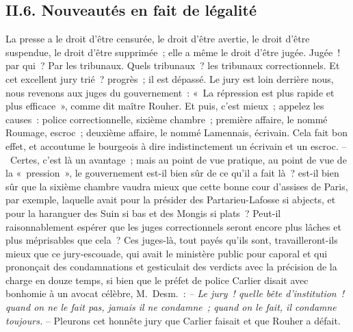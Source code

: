 \documentclass[french,twoside]{book} %
\begin{document}
\subsection[{II.6. Nouveautés en fait de légalité}]{II.6. Nouveautés en fait de légalité}
\noindent La presse a le droit d’être censurée, le droit d’être avertie, le droit d’être suspendue, le droit d’être supprimée ; elle a même le droit d’être jugée. Jugée ! par qui ? Par les tribunaux. Quels tribunaux ? les tribunaux correctionnels. Et cet excellent jury trié ? progrès ; il est dépassé. Le jury est loin derrière nous, nous revenons aux juges du gouvernement : « La répression est plus rapide et plus efficace », comme dit maître Rouher. Et puis, c’est mieux ; appelez les causes : police correctionnelle, sixième chambre ; première affaire, le nommé Roumage, escroc ; deuxième affaire, le nommé Lamennais, écrivain. Cela fait bon effet, et accoutume le bourgeois à dire indistinctement un écrivain et un escroc. – Certes, c’est là un avantage ; mais au point de vue pratique, au point de vue de la « pression », le gouvernement est-il bien sûr de ce qu’il a fait là ? est-il bien sûr que la sixième chambre vaudra mieux que cette bonne cour d’assises de Paris, par exemple, laquelle avait pour la présider des Partarieu-Lafosse si abjects, et pour la haranguer des Suin si bas et des Mongis si plats ? Peut-il raisonnablement espérer que les juges correctionnels seront encore plus lâches et plus méprisables que cela ? Ces juges-là, tout payés qu’ils sont, travailleront-ils mieux que ce jury-escouade, qui avait le ministère public pour caporal et qui prononçait des condamnations et gesticulait des verdicts avec la précision de la charge en douze temps, si bien que le préfet de police Carlier disait avec bonhomie à un avocat célèbre, M. Desm. : \emph{– Le jury ! quelle bête d’institution ! quand on ne le fait pas, jamais il ne condamne ; quand on le fait, il condamne toujours.} – Pleurons cet honnête jury que Carlier faisait et que Rouher a défait.\par
\end{document}
